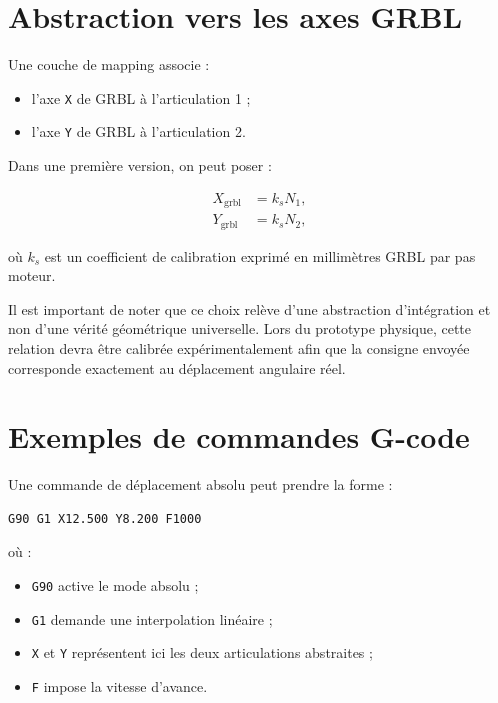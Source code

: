 \documentclass[12pt,a4paper]{report}
\begin{document}
\section{Abstraction vers les axes GRBL}

Une couche de mapping associe :

\begin{itemize}
    \item l'axe \texttt{X} de GRBL à l'articulation 1 ;
    \item l'axe \texttt{Y} de GRBL à l'articulation 2.
\end{itemize}

Dans une première version, on peut poser :

\begin{align}
    X_{\text{grbl}} &= k_s N_1, \\
    Y_{\text{grbl}} &= k_s N_2,
\end{align}

où $k_s$ est un coefficient de calibration exprimé en millimètres GRBL par pas moteur.

Il est important de noter que ce choix relève d'une abstraction d'intégration et non
d'une vérité géométrique universelle. Lors du prototype physique, cette relation devra
être calibrée expérimentalement afin que la consigne envoyée corresponde exactement au
déplacement angulaire réel.

\section{Exemples de commandes G-code}

Une commande de déplacement absolu peut prendre la forme :

\begin{lstlisting}[style=codestyle,caption={Exemple de commande G-code pour une consigne articulaire}]
G90 G1 X12.500 Y8.200 F1000
\end{lstlisting}

où :

\begin{itemize}
    \item \texttt{G90} active le mode absolu ;
    \item \texttt{G1} demande une interpolation linéaire ;
    \item \texttt{X} et \texttt{Y} représentent ici les deux articulations abstraites ;
    \item \texttt{F} impose la vitesse d'avance.
\end{itemize}
\end{document}
